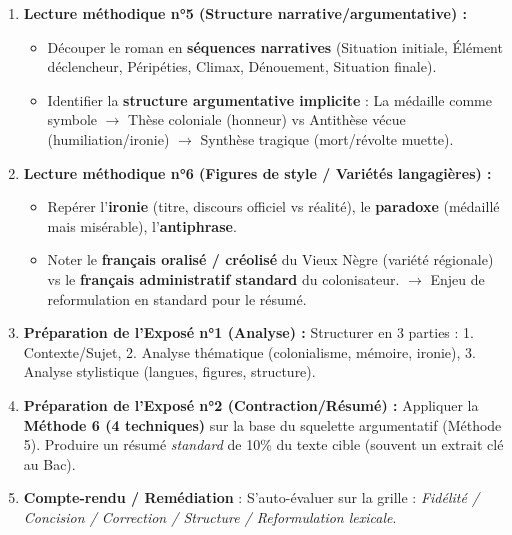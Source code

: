 \documentclass[11pt]{article}
\begin{document}
\begin{methode}
    \begin{enumerate}
        \item \textbf{Lecture méthodique n°5 (Structure narrative/argumentative) :}
            \begin{itemize}
                \item Découper le roman en \textbf{séquences narratives} (Situation initiale, Élément déclencheur, Péripéties, Climax, Dénouement, Situation finale).
                \item Identifier la \textbf{structure argumentative implicite} : La médaille comme symbole $\rightarrow$ Thèse coloniale (honneur) vs Antithèse vécue (humiliation/ironie) $\rightarrow$ Synthèse tragique (mort/révolte muette).
            \end{itemize}
        \item \textbf{Lecture méthodique n°6 (Figures de style / Variétés langagières) :}
            \begin{itemize}
                \item Repérer l'\textbf{ironie} (titre, discours officiel vs réalité), le \textbf{paradoxe} (médaillé mais misérable), l'\textbf{antiphrase}.
                \item Noter le \textbf{français oralisé / créolisé} du Vieux Nègre (variété régionale) vs le \textbf{français administratif standard} du colonisateur. $\rightarrow$ Enjeu de reformulation en standard pour le résumé.
            \end{itemize}
        \item \textbf{Préparation de l'Exposé n°1 (Analyse) :} Structurer en 3 parties : 1. Contexte/Sujet, 2. Analyse thématique (colonialisme, mémoire, ironie), 3. Analyse stylistique (langues, figures, structure).
        \item \textbf{Préparation de l'Exposé n°2 (Contraction/Résumé) :} Appliquer la \textbf{Méthode 6 (4 techniques)} sur la base du squelette argumentatif (Méthode 5). Produire un résumé \emph{standard} de 10\% du texte cible (souvent un extrait clé au Bac).
        \item \textbf{Compte-rendu / Remédiation} : S'auto-évaluer sur la grille : \emph{Fidélité / Concision / Correction / Structure / Reformulation lexicale}.
    \end{enumerate}
\end{methode}
\end{document}
